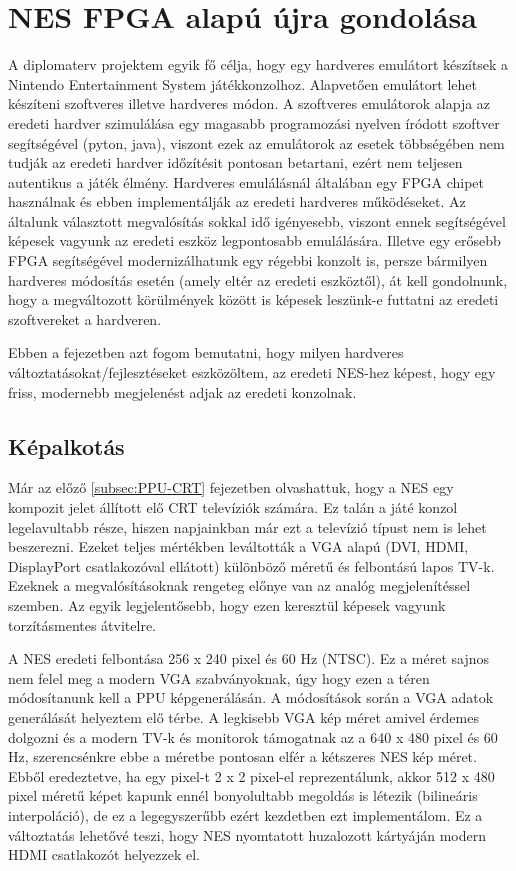 \chapter{NES FPGA alapú újra gondolása}

A diplomaterv projektem egyik fő célja, hogy egy hardveres emulátort készítsek a Nintendo Entertainment System játékkonzolhoz. Alapvetően emulátort lehet készíteni szoftveres illetve hardveres módon. A szoftveres emulátorok alapja az eredeti hardver szimulálása egy magasabb programozási nyelven íródott szoftver segítségével (pyton, java), viszont ezek az emulátorok az esetek többségében nem tudják az eredeti hardver időzítésit pontosan betartani, ezért nem teljesen autentikus a játék élmény. Hardveres emulálásnál általában egy FPGA chipet használnak és ebben implementálják az eredeti hardveres működéseket. Az általunk választott megvalósítás sokkal idő igényesebb, viszont ennek segítségével képesek vagyunk az eredeti eszköz legpontosabb emulálására. Illetve egy erősebb FPGA segítségével modernizálhatunk egy régebbi konzolt is, persze bármilyen hardveres módosítás esetén (amely eltér az eredeti eszköztől), át kell gondolnunk, hogy a megváltozott körülmények között is képesek leszünk-e futtatni az eredeti szoftvereket a hardveren. 

Ebben a fejezetben azt fogom bemutatni, hogy milyen hardveres változtatásokat/fejlesztéseket eszközöltem, az eredeti NES-hez képest, hogy egy friss, modernebb megjelenést adjak az eredeti konzolnak.

\section{Képalkotás}

Már az előző \ref{subsec:PPU-CRT} fejezetben olvashattuk, hogy a NES egy kompozit jelet állított elő CRT televíziók számára. Ez talán a játé konzol legelavultabb része, hiszen napjainkban már ezt a televízió típust nem is lehet beszerezni. Ezeket teljes mértékben leváltották a VGA alapú (DVI, HDMI, DisplayPort csatlakozóval ellátott) különböző méretű és felbontású lapos TV-k. Ezeknek a megvalósításoknak rengeteg előnye van az analóg megjelenítéssel szemben. Az egyik legjelentősebb, hogy ezen keresztül képesek vagyunk torzításmentes átvitelre.

A NES eredeti felbontása 256 x 240 pixel és 60 Hz (NTSC). Ez a  méret sajnos nem felel meg a modern VGA szabványoknak, úgy hogy ezen a téren módosítanunk kell a PPU képgenerálásán. A módosítások során a VGA adatok generálását helyeztem elő térbe. A legkisebb VGA kép méret amivel érdemes dolgozni és a modern TV-k és monitorok támogatnak az a 640 x 480 pixel és 60 Hz, szerencsénkre ebbe a méretbe pontosan elfér a kétszeres NES kép méret. Ebből eredeztetve, ha egy pixel-t 2 x 2 pixel-el reprezentálunk, akkor 512 x 480 pixel méretű képet kapunk ennél bonyolultabb megoldás is létezik (bilineáris interpoláció), de ez a legegyszerűbb ezért kezdetben ezt implementálom. Ez a változtatás lehetővé teszi, hogy NES nyomtatott huzalozott kártyáján modern HDMI csatlakozót helyezzek el. 

